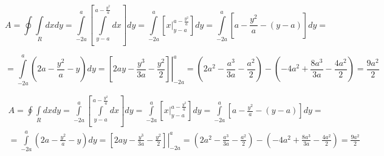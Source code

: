 \documentclass{article}
\begin{document}
$$
A = 
\oint \int\limits_R dxdy = 
\int\limits_{-2a}^{a}\left[\int\limits_{y-a}^{a-\frac{y^2}{a}} dx\right] dy = 
\int\limits_{-2a}^{a}\left[\left.{x}\right|_{y-a}^{a-\frac{y^2}{a}}\right] dy =
\int\limits_{-2a}^{a}\left[a - \frac{y^2}{a} - (y-a)\right] dy =
$$

$$
=\int\limits_{-2a}^{a}\left(2a - \frac{y^2}{a} - y\right) dy =
\left.\left[2ay - \frac{y^3}{3a} - \frac{y^2}{2}\right]\right|_{-2a}^{a} =
\left(2a^2-\frac{a^3}{3a}-\frac{a^2}{2}\right)-\left(-4a^2+\frac{8a^3}{3a}-\frac{4a^2}{2}\right)=
\frac{9a^2}{2}
$$





\begin{equation}
\begin{gathered}
A =
\oint \int\limits_R dxdy = 
\int\limits_{-2a}^{a}\left[\int\limits_{y-a}^{a-\frac{y^2}{a}} dx\right] dy = 
\int\limits_{-2a}^{a}\left[\left.{x}\right|_{y-a}^{a-\frac{y^2}{a}}\right] dy =
\int\limits_{-2a}^{a}\left[a - \frac{y^2}{a} - (y-a)\right] dy =\\
=\int\limits_{-2a}^{a}\left(2a - \frac{y^2}{a} - y\right) dy =
\left.\left[2ay - \frac{y^3}{3a} - \frac{y^2}{2}\right]\right|_{-2a}^{a} =
\left(2a^2-\frac{a^3}{3a}-\frac{a^2}{2}\right)-\left(-4a^2+\frac{8a^3}{3a}-\frac{4a^2}{2}\right)=
\frac{9a^2}{2}
\end{gathered}
\end{equation}
\end{document}
